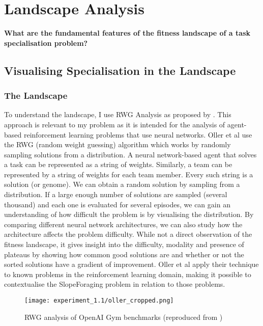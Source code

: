 \documentclass[12pt]{article}
\begin{document}
\section{Landscape Analysis}

\textbf{What are the fundamental features of the fitness landscape of a task specialisation problem?}\\

\subsection{Visualising Specialisation in the Landscape}

\subsubsection{The Landscape}

To understand the landscape, I use RWG Analysis as proposed by \cite{oller:AAMAS:2020}.
This approach is relevant to my problem as it is intended for the analysis of agent-based reinforcement learning problems that use neural networks.
Oller et al use the RWG (random weight guessing) algorithm which works by randomly sampling solutions from a distribution.
A neural network-based agent that solves a task can be represented as a string of weights.
Similarly, a team can be represented by a string of weights for each team member.
Every such string is a solution (or genome).
We can obtain a random solution by sampling from a distribution.
If a large enough number of solutions are sampled (several thousand) and each one is evaluated for several episodes, we can gain an understanding of how difficult the problem is by visualising the distribution.
By comparing different neural network architectures, we can also study how the architecture affects the problem difficulty.
While not a direct observation of the fitness landscape, it gives insight into the difficulty, modality and presence of plateaus by showing how common good solutions are and whether or not the sorted solutions have a gradient of improvement.
Oller et al apply their technique to known problems in the reinforcement learning domain, making it possible to contextualise the SlopeForaging problem in relation to those problems.\\

\begin{figure}
	\centering
	\texttt{[image: experiment\_1.1/oller\_cropped.png]}
	\caption{RWG analysis of OpenAI Gym benchmarks (reproduced from \cite{oller:AAMAS:2020})}
	\label{fig:oller}
\end{figure}
\end{document}
